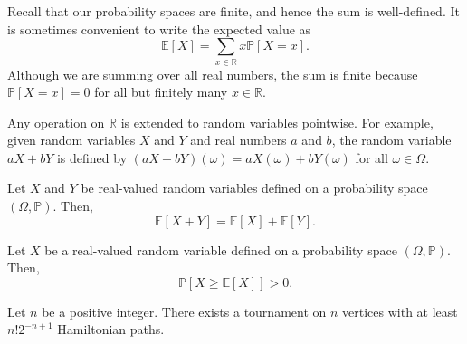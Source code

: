Recall that our probability spaces are finite,
and hence the sum is well-defined.
It is sometimes convenient to write the expected value as
\begin{equation}
    \mathbb{E}[X] = \sum_{x \in \mathbb{R}} x \mathbb{P}[X = x].
\end{equation}
Although we are summing over all real numbers,
the sum is finite because \(\mathbb{P}[X = x] = 0\) for all but finitely many \(x \in \mathbb{R}\).

Any operation on \(\mathbb{R}\) is extended to random variables pointwise.
For example, given random variables \(X\) and \(Y\) and real numbers \(a\) and \(b\), the random variable \(aX + bY\) is defined by \((aX + bY)(\omega) = aX(\omega) + bY(\omega)\) for all \(\omega \in \Omega\).

\begin{lemma} \label{lem:linearity-of-expectation}
    Let \(X\) and \(Y\) be real-valued random variables defined on a probability space \((\Omega, \mathbb{P})\).
    Then,
    \begin{equation}
        \mathbb{E}[X + Y] = \mathbb{E}[X] + \mathbb{E}[Y].
    \end{equation}
\end{lemma}

\begin{lemma}
    Let \(X\) be a real-valued random variable defined on a probability space \((\Omega, \mathbb{P})\). Then,
    \begin{equation}
        \mathbb{P}[X \geq \mathbb{E}[X]] > 0.
    \end{equation}
\end{lemma}

\begin{proposition}
    Let \(n\) be a positive integer.
    There exists a tournament on \(n\) vertices
    with at least \({n!} 2^{-n+1}\) Hamiltonian paths.
\end{proposition}

